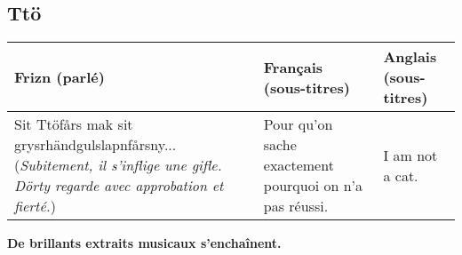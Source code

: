 \subsection*{Ttö}
\begin{tabular}{|p{2in}|p{2in}|p{2in}|}\hline
Frizn (parlé) & Français (sous-titres) & Anglais (sous-titres) \\\hline
Sit Ttöfårs mak sit grysr\-händ\-gul\-slapn\-fårs\-ny...(\emph{Subitement,
il s'inflige une gifle. Dörty regarde avec approbation et fierté.}) &
Pour qu'on sache exactement pourquoi on n'a pas réussi. &
I am not a cat.\\\hline
\end{tabular}

\begin{center}\textbf{De brillants extraits musicaux
s'enchaînent.}\end{center}